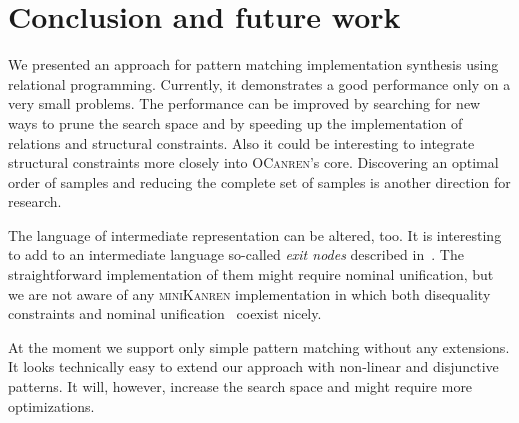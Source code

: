 \section{Conclusion and future work}

We presented an approach for pattern matching implementation synthesis using relational programming. Currently, it demonstrates a good performance only
on a very small problems. The performance can be improved by searching for new ways to prune the search space and by speeding up the implementation of
relations and structural constraints. Also it could be interesting to integrate structural constraints more closely into \textsc{OCanren}'s core.
Discovering an optimal order of samples and reducing the complete set of samples is another direction for research.

The language of intermediate representation can be altered, too. It is interesting to add to an intermediate language so-called \emph{exit nodes}
described in~\cite{maranget2001}. The straightforward implementation of them might require nominal unification, but we are not aware of any
\textsc{miniKanren} implementation in which both disequality constraints and nominal unification~\cite{alphaKanren} coexist nicely.

At the moment we support only simple pattern matching without any extensions. It looks technically easy to extend our approach with
non-linear and disjunctive patterns. It will, however, increase the search space and might require more optimizations.



